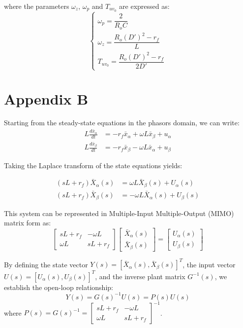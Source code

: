 \documentclass[DIV=calc, paper=a4, fontsize=11pt, twocolumn]{scrartcl}	 %
\begin{document}
{where the parameters $\omega_z$, $\omega_p$ and $T_{uv_0}$ are expressed as:
\begin{equation} 
\begin{cases} 
\omega_p = \dfrac{2}{R_o C} \\[15pt] 
\omega_z = \dfrac{R_o (D')^2 - r_f}{L} \\[15pt] 
T_{uv_0} = \dfrac{R_o (D')^2 - r_f}{2 D'} 
\end{cases}
\end{equation}
\section*{Appendix B}
Starting from the steady-state equations in the phasors domain, we can write:
\begin{subequations}
\begin{align}
    L \frac{d\bar{x}_\alpha}{dt} &= -r_f \bar{x}_\alpha + \omega L \bar{x}_\beta + u_\alpha \\
    L \frac{d\bar{x}_\beta}{dt} &= -r_f \bar{x}_\beta - \omega L \bar{x}_\alpha + u_\beta
\end{align}
\end{subequations}

Taking the Laplace transform of the state equations yields:

\begin{align}
    (sL + r_f)\bar{X}_\alpha(s) &= \omega L \bar{X}_\beta(s) + U_\alpha(s) \\
    (sL + r_f)\bar{X}_\beta(s) &= -\omega L \bar{X}_\alpha(s) + U_\beta(s)
\end{align}

This system can be represented in Multiple-Input Multiple-Output (MIMO) matrix form as:
\begin{equation}
    \begin{bmatrix} sL+r_f & -\omega L \\ \omega L & sL+r_f \end{bmatrix} \begin{bmatrix} \bar{X}_\alpha(s) \\ \bar{X}_\beta(s) \end{bmatrix} = \begin{bmatrix} U_\alpha(s) \\ U_\beta(s) \end{bmatrix}
\end{equation}

By defining the state vector $Y(s) = [\bar{X}_\alpha(s), \bar{X}_\beta(s)]^T$, the input vector $U(s) = [U_\alpha(s), U_\beta(s)]^T$, and the inverse plant matrix $G^{-1}(s)$, we establish the open-loop relationship:
\begin{equation}
    Y(s) = G(s)^{-1}U(s) = P(s)U(s)
\end{equation}
where $P(s) = G(s)^{-1} = \begin{bmatrix} sL+r_f & -\omega L \\ \omega L & sL+r_f \end{bmatrix}^{-1}$.

}
\end{document}
